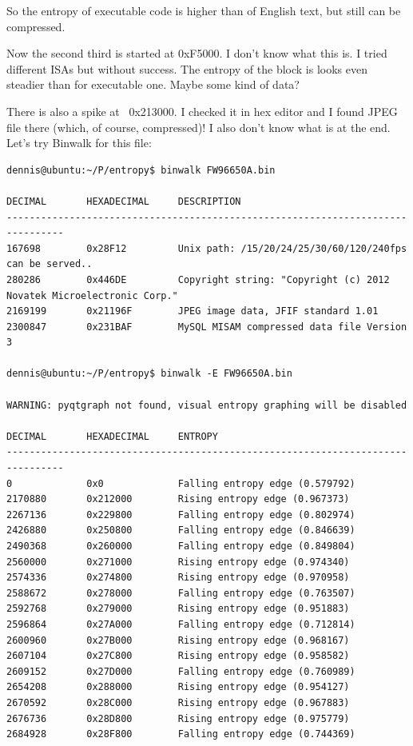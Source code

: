 So the entropy of executable code is higher than of English text, but still can be compressed.

Now the second third is started at 0xF5000. I don't know what this is. I tried different ISAs but without success.
The entropy of the block is looks even steadier than for executable one.
Maybe some kind of data?

There is also a spike at ~0x213000. I checked it in hex editor and I found JPEG file there 
(which, of course, compressed)!
I also don't know what is at the end.
Let's try Binwalk for this file:

\begin{lstlisting}
dennis@ubuntu:~/P/entropy$ binwalk FW96650A.bin 

DECIMAL       HEXADECIMAL     DESCRIPTION
--------------------------------------------------------------------------------
167698        0x28F12         Unix path: /15/20/24/25/30/60/120/240fps can be served..
280286        0x446DE         Copyright string: "Copyright (c) 2012 Novatek Microelectronic Corp."
2169199       0x21196F        JPEG image data, JFIF standard 1.01
2300847       0x231BAF        MySQL MISAM compressed data file Version 3

dennis@ubuntu:~/P/entropy$ binwalk -E FW96650A.bin 

WARNING: pyqtgraph not found, visual entropy graphing will be disabled

DECIMAL       HEXADECIMAL     ENTROPY
--------------------------------------------------------------------------------
0             0x0             Falling entropy edge (0.579792)
2170880       0x212000        Rising entropy edge (0.967373)
2267136       0x229800        Falling entropy edge (0.802974)
2426880       0x250800        Falling entropy edge (0.846639)
2490368       0x260000        Falling entropy edge (0.849804)
2560000       0x271000        Rising entropy edge (0.974340)
2574336       0x274800        Rising entropy edge (0.970958)
2588672       0x278000        Falling entropy edge (0.763507)
2592768       0x279000        Rising entropy edge (0.951883)
2596864       0x27A000        Falling entropy edge (0.712814)
2600960       0x27B000        Rising entropy edge (0.968167)
2607104       0x27C800        Rising entropy edge (0.958582)
2609152       0x27D000        Falling entropy edge (0.760989)
2654208       0x288000        Rising entropy edge (0.954127)
2670592       0x28C000        Rising entropy edge (0.967883)
2676736       0x28D800        Rising entropy edge (0.975779)
2684928       0x28F800        Falling entropy edge (0.744369)
\end{lstlisting}

